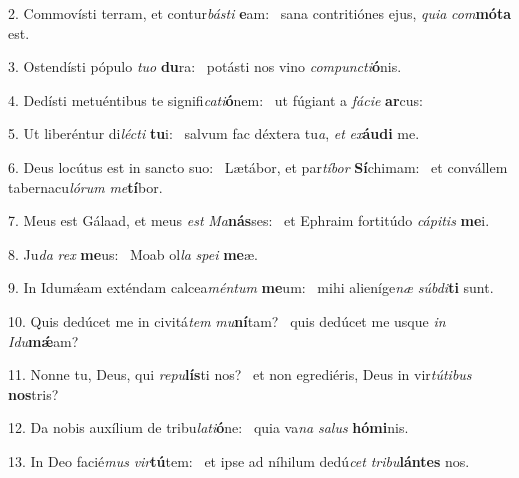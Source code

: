 2. Commovísti terram, et contur\textit{bás}\textit{ti} \textbf{e}am: \ast\  sana contritiónes ejus, \textit{qui}\textit{a} \textit{com}\textbf{mó}\textbf{ta} est.\

3. Ostendísti pópulo \textit{tu}\textit{o} \textbf{du}ra: \ast\  potásti nos vino \textit{com}\textit{punc}\textit{ti}\textbf{ó}nis.\

4. Dedísti metuéntibus te signifi\textit{ca}\textit{ti}\textbf{ó}nem: \ast\  ut fúgiant a \textit{fá}\textit{ci}\textit{e} \textbf{ar}cus:\

5. Ut liberéntur di\textit{léc}\textit{ti} \textbf{tu}i: \ast\  salvum fac déxtera tu\textit{a}, \textit{et} \textit{ex}\textbf{áu}\textbf{di} me.\

6. Deus locútus est in sancto suo: \dag\  Lætábor, et par\textit{tí}\textit{bor} \textbf{Sí}chimam: \ast\  et convállem tabernacu\textit{ló}\textit{rum} \textit{me}\textbf{tí}bor.\

7. Meus est Gálaad, et meus \textit{est} \textit{Ma}\textbf{nás}ses: \ast\  et Ephraim fortitúdo \textit{cá}\textit{pi}\textit{tis} \textbf{me}i.\

8. Ju\textit{da} \textit{rex} \textbf{me}us: \ast\  Moab ol\textit{la} \textit{spe}\textit{i} \textbf{me}æ.\

9. In Idumǽam exténdam calcea\textit{mén}\textit{tum} \textbf{me}um: \ast\  mihi alieníge\textit{næ} \textit{súb}\textit{di}\textbf{ti} sunt.\

10. Quis dedúcet me in civitá\textit{tem} \textit{mu}\textbf{ní}tam? \ast\  quis dedúcet me usque \textit{in} \textit{I}\textit{du}\textbf{mǽ}am?\

11. Nonne tu, Deus, qui \textit{re}\textit{pu}\textbf{lís}ti nos? \ast\  et non egrediéris, Deus in vir\textit{tú}\textit{ti}\textit{bus} \textbf{nos}tris?\

12. Da nobis auxílium de tribu\textit{la}\textit{ti}\textbf{ó}ne: \ast\  quia va\textit{na} \textit{sa}\textit{lus} \textbf{hó}\textbf{mi}nis.\

13. In Deo facié\textit{mus} \textit{vir}\textbf{tú}tem: \ast\  et ipse ad níhilum dedú\textit{cet} \textit{tri}\textit{bu}\textbf{lán}\textbf{tes} nos.\

